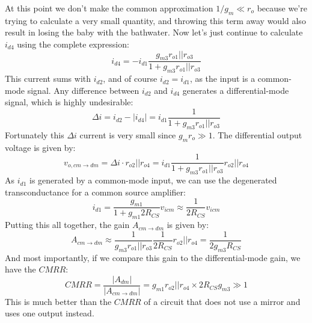 At this point we don't make the common approximation $1/g_m \ll r_o$ because we're trying to calculate a very small quantity, and throwing this term away would also result in losing the baby with the bathwater.  Now let's just continue to calculate $i_{d4}$ using the complete expression:
    \begin{equation}
        i_{d4} =  -i_{d1}  \frac{g_{m3} r_{o1} || r_{o3}}{1 + g_{m3} r_{o1} || r_{o3}}
    \end{equation}
This current sums with $i_{d2}$, and of course $i_{d2} = i_{d1}$, as the input is a common-mode signal. Any difference between $i_{d2}$ and $i_{d4}$ generates a differential-mode signal, which is highly undesirable:
    \begin{equation}
        \Delta i = i_{d2} - | i_{d4} | = i_{d1}  \frac{1}{1 + g_{m3} r_{o1} || r_{o3}}
    \end{equation}
Fortunately this $\Delta i$ current is very small since $g_m r_o \gg 1$.  The differential output voltage is given by:
    \begin{equation}
        v_{o,cm\to dm} = \Delta i \cdot r_{o2}||r_{o4} = i_{d1}  \frac{1}{1 + g_{m3} r_{o1} || r_{o3}} r_{o2}||r_{o4}
    \end{equation}
As $i_{d1}$ is generated by a common-mode input, we can use the degenerated transconductance for a common source amplifier:
    \begin{equation}
        i_{d1} = \frac{g_{m1}}{1 + g_{m1} 2 R_{CS}} v_{icm} \approx \frac{1}{2 R_{CS}} v_{icm}
    \end{equation}
Putting this all together, the gain $A_{cm \to dm}$ is given by:
    \begin{equation}
        {A_{cm \to dm }} \approx  \frac{1}{g_{m3} r_{o1} || r_{o3}} \frac{1}{2 R_{CS}}  r_{o2}||r_{o4} = \frac{1}{2 g_{m3} R_{CS}} 
    \end{equation}
And most importantly, if we compare this gain to the differential-mode gain, we have the $CMRR$:
    \begin{equation}
        CMRR = \frac{{\left| {{A_{dm}}} \right|}}{{\left| {{A_{cm \to dm}}} \right|}} = {g_{m1}} r_{o2} || r_{o4} \times 2 R_{CS} g_{m3} \gg 1
    \end{equation}
This is much better than the $CMRR$ of a circuit that does not use a mirror and uses one output instead.
